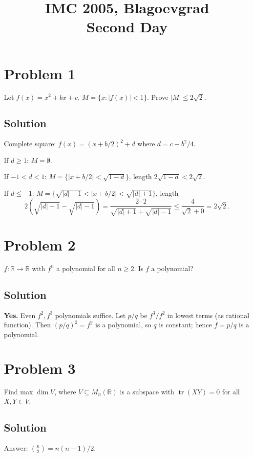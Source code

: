 \documentclass{article}
\title{IMC 2005, Blagoevgrad \\ Second Day}
\date{}
\begin{document}
\maketitle

\section*{Problem 1}
Let $f(x) = x^2 + bx + c$, $M = \{x : |f(x)| < 1\}$. Prove $|M| \le 2\sqrt 2$.

\subsection*{Solution}
Complete square: $f(x) = (x + b/2)^2 + d$ where $d = c - b^2/4$.

If $d \ge 1$: $M = \emptyset$.

If $-1 < d < 1$: $M = \{|x + b/2| < \sqrt{1 - d}\}$, length $2\sqrt{1 - d} < 2\sqrt 2$.

If $d \le -1$: $M = \{\sqrt{|d| - 1} < |x + b/2| < \sqrt{|d| + 1}\}$, length
\[
2(\sqrt{|d| + 1} - \sqrt{|d| - 1}) = \frac{2 \cdot 2}{\sqrt{|d| + 1} + \sqrt{|d| - 1}} \le \frac{4}{\sqrt 2 + 0} = 2\sqrt 2.
\]

\section*{Problem 2}
$f : \mathbb{R} \to \mathbb{R}$ with $f^n$ a polynomial for all $n \ge 2$. Is $f$ a polynomial?

\subsection*{Solution}
\textbf{Yes.} Even $f^2, f^3$ polynomials suffice. Let $p/q$ be $f^3/f^2$ in lowest terms (as rational function). Then $(p/q)^2 = f^2$ is a polynomial, so $q$ is constant; hence $f = p/q$ is a polynomial.

\section*{Problem 3}
Find max $\dim V$, where $V \subseteq M_n(\mathbb{R})$ is a subspace with $\operatorname{tr}(XY) = 0$ for all $X, Y \in V$.

\subsection*{Solution}
Answer: $\binom{n}{2} = n(n-1)/2$.
\end{document}
